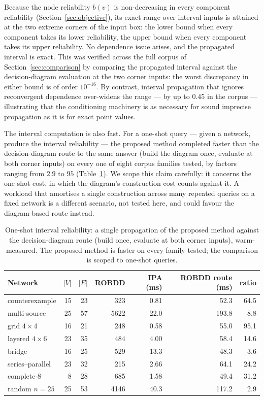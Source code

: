 \documentclass[preprint,12pt]{elsarticle}
\theoremstyle{definition}
\begin{document}
Because the node reliability $b(v)$ is non-decreasing in every component reliability
(Section~\ref{sec:objective}), its exact range over interval inputs is attained at the two extreme
corners of the input box: the lower bound when every component takes its lower reliability, the upper
bound when every component takes its upper reliability. No dependence issue arises, and the propagated
interval is exact. This was verified across the full corpus of Section~\ref{sec:comparison} by comparing
the propagated interval against the decision-diagram evaluation at the two corner inputs: the worst
discrepancy in either bound is of order $10^{-16}$. By contrast, interval propagation that ignores
reconvergent dependence over-widens the range --- by up to $0.45$ in the corpus --- illustrating that
the conditioning machinery is as necessary for sound imprecise propagation as it is for exact point
values.

The interval computation is also fast. For a one-shot query --- given a network, produce the interval
reliability --- the proposed method completed faster than the decision-diagram route to the same answer
(build the diagram once, evaluate at both corner inputs) on every one of eight corpus families tested,
by factors ranging from $2.9$ to $95$ (Table~\ref{tab:interval_timing}). We scope this claim carefully:
it concerns the one-shot cost, in which the diagram's construction cost counts against it. A workload
that amortises a single construction across many repeated queries on a fixed network is a different
scenario, not tested here, and could favour the diagram-based route instead.

\begin{table}[t]
\centering\small
\caption{One-shot interval reliability: a single propagation of the proposed method against the
decision-diagram route (build once, evaluate at both corner inputs), warm-measured. The proposed method
is faster on every family tested; the comparison is scoped to one-shot queries.}
\label{tab:interval_timing}
\begin{tabular}{lrrrrrr}
\toprule
Network & $|V|$ & $|E|$ & ROBDD & IPA (ms) & ROBDD route (ms) & ratio\\
\midrule
counterexample   & 15 & 23 &  323 &  0.81 &  52.3 & 64.5\\
multi-source     & 25 & 57 & 5622 & 22.0  & 193.8 &  8.8\\
grid $4{\times}4$& 16 & 21 &  248 &  0.58 &  55.0 & 95.1\\
layered $4{\times}6$ & 23 & 35 & 484 & 4.00 & 58.4 & 14.6\\
bridge           & 16 & 25 &  529 & 13.3  &  48.3 &  3.6\\
series--parallel & 23 & 32 &  215 &  2.66 &  64.1 & 24.2\\
complete-8       &  8 & 28 &  685 &  1.58 &  49.4 & 31.2\\
random $n{=}25$  & 25 & 53 & 4146 & 40.3  & 117.2 &  2.9\\
\bottomrule
\end{tabular}
\end{table}
\end{document}
